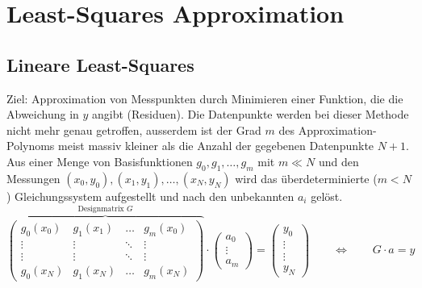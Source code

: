 \section{Least-Squares Approximation}
\subsection{Lineare Least-Squares}
Ziel: Approximation von Messpunkten durch Minimieren einer Funktion, die die Abweichung in $y$ 
angibt (Residuen). Die Datenpunkte werden bei dieser Methode nicht mehr genau getroffen, ausserdem ist der Grad $m$ des Approximation-Polynoms meist massiv kleiner als die Anzahl der gegebenen Datenpunkte $N+1$.\\

Aus einer Menge von Basisfunktionen ${g_0,g_1,\ldots,g_m}$ mit $m \ll N$ und den Messungen $(x_0,y_0),(x_1,y_1),\ldots,(x_N,y_N)$ wird das überdeterminierte ($m<N$) Gleichungssystem aufgestellt und nach den unbekannten $a_i$ gelöst.
\[
    \overbrace{
    \begin{pmatrix}
        g_0(x_0) & g_1(x_1) & \ldots & g_m(x_0) \\
        \vdots & \vdots & \ddots & \vdots \\
        \vdots & \vdots & \ddots & \vdots \\
        g_0(x_N) & g_1(x_N) & \ldots & g_m(x_N) 
    \end{pmatrix}}^{\text{Designmatrix } G}
    \cdot
    \begin{pmatrix}
        a_0 \\ \vdots \\ a_m
    \end{pmatrix}
    =
    \begin{pmatrix}
        y_0 \\ \vdots \\ \vdots \\ y_N
    \end{pmatrix}
    \qquad
    \Leftrightarrow
    \qquad
    G \cdot a = y
\]


